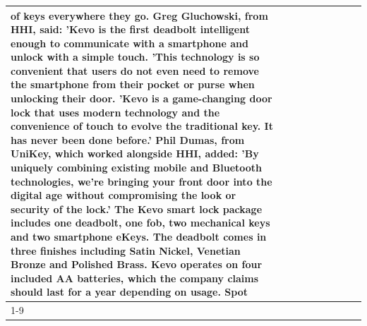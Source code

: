 \begin{table}[H]
\begin{tabular}{lllrlllll}
of keys everywhere they go. Greg Gluchowski, from HHI, said: 'Kevo is the first deadbolt intelligent enough to communicate with a smartphone and unlock with a simple touch. 'This technology is so convenient that users do not even need to remove the smartphone from their pocket or purse when unlocking their door. 'Kevo is a game-changing door lock that uses modern technology and the convenience of touch to evolve the traditional key. It has never been done before.' Phil Dumas, from UniKey, which worked alongside HHI, added: 'By uniquely combining existing mobile and Bluetooth technologies, we’re bringing your front door into the digital age without compromising the look or security of the lock.' The Kevo smart lock package includes one deadbolt, one fob, two mechanical keys and two smartphone eKeys. The deadbolt comes in three finishes including Satin Nickel, Venetian Bronze and Polished Brass. Kevo operates on four included AA batteries, which the company claims should last for a year depending on usage. Spot \\
\cline{1-9}

\end{tabular}
\end{table}
